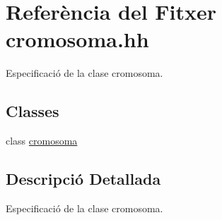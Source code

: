 \hypertarget{cromosoma_8hh}{}\section{Referència del Fitxer cromosoma.\+hh}
\label{cromosoma_8hh}


Especificació de la clase cromosoma.  


\subsection*{Classes}
\begin{DoxyCompactItemize}
\item 
class \hyperlink{classcromosoma}{cromosoma}
\end{DoxyCompactItemize}


\subsection{Descripció Detallada}
Especificació de la clase cromosoma. 

